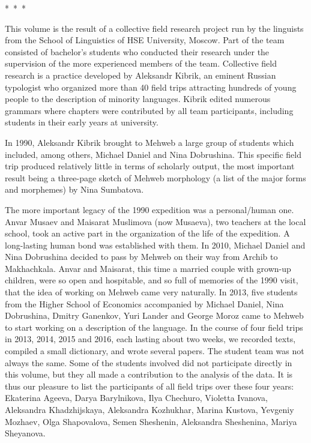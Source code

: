\begin{refsection}
\medskip
\centerline{*\ *\ *}

\medskip
This volume is the result of a collective field research project run by the
linguists from the School of Linguistics of HSE University, Moscow. Part of the team consisted of bachelor's
students who conducted their research under the supervision of the more
experienced members of the team. Collective field research is a practice
developed by Aleksandr Kibrik, an eminent Russian typologist who
organized more than 40 field trips attracting hundreds of young people
to the description of minority languages. Kibrik edited numerous grammars
where chapters were contributed by all team participants, including
students in their early years at university.

In 1990, Aleksandr Kibrik brought to Mehweb a large group of students
which included, among others, Michael Daniel and Nina Dobrushina. This specific field trip produced relatively little in terms of scholarly output, the most important result being a three-page sketch of Mehweb morphology (a list of the major forms
and morphemes) by Nina Sumbatova.

The more important legacy of the 1990 expedition was a personal/human one. Anvar Musaev and Maisarat
Muslimova (now Musaeva), two teachers at the local school, took an active part in the
organization of the life of the expedition. A long-lasting
human bond was established with them. In 2010, Michael Daniel and Nina
Dobrushina decided to pass by Mehweb on their way from Archib to
Makhachkala. Anvar and Maisarat, this time a married couple with
grown-up children, were so open and hospitable, and so full of memories
of the 1990 visit, that the idea of working on Mehweb came very
naturally. In 2013, five students from the Higher School of Economics
accompanied by Michael Daniel, Nina Dobrushina, Dmitry Ganenkov, Yuri
Lander and George Moroz came to Mehweb to start working on a description
of the language. In the course of four field trips in 2013, 2014, 2015 and 2016, each
lasting about two weeks, we recorded texts, compiled a small
dictionary, and wrote several papers. The student team was not always
the same. Some of the students involved did not participate directly in this volume, 
but they all made a contribution to the analysis of the data. It is thus our
pleasure to list the participants of all field trips over these four
years: Ekaterina Ageeva, Darya Barylnikova, Ilya Chechuro, Violetta
Ivanova, Aleksandra Khadzhijskaya, Aleksandra Kozhukhar, Marina Kustova,
Yevgeniy Mozhaev, Olga Shapovalova, Semen Sheshenin, Aleksandra
Sheshenina, Mariya Sheyanova.


\end{refsection}

